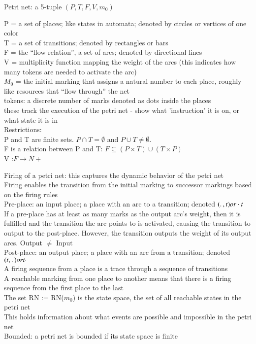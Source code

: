 \begin{definition}
\label{def:Petri-net}
Petri net: a 5-tuple $(P, T, F, V, m_0)$ 

P = a set of places; like states in automata; denoted by circles or vertices of one color\\
T = a set of transitions; denoted by rectangles or bars\\
F = the “flow relation”, a set of arcs; denoted by directional lines\\
V = multiplicity function mapping the weight of the arcs (this indicates how many tokens are needed to activate the arc)\\
$M_0$ = the initial marking that assigns a natural number to each place, roughly like resources that “flow through” the net\\
	tokens: a discrete number of marks denoted as dots inside the places \\
	these track the execution of the petri net - show what 'instruction' it is on, or what state it is in\\
	
\noindent Restrictions: \\
P and T are finite sets. $P\cap T = \emptyset$   and $P\cup T \neq \emptyset.$\\
F is a relation between P and T: $ F \subseteq (P \times T) \cup (T \times P)$\\
V :$ F \rightarrow N+ $\\
\end {definition}
Firing of a petri net: this captures the dynamic behavior of the petri net\\
Firing enables the transition from the initial marking to successor markings based on the firing rules\\
Pre-place: an input place; a place with an arc to a transition; denoted $(\ldotp , t) or  \cdot t$\\
If a pre-place has at least as many marks as the output arc's weight, then it is fulfilled and the transition the arc points to is activated, causing the transition to output to the post-place. However, the transition outputs the weight of its output arcs. Output $\ne$ Input\\
Post-place: an output place; a place with an arc from a transition; denoted $(t, \ldotp ) or t \cdot $ \\
A firing sequence from a place is a trace through a sequence of transitions\\
A reachable marking from one place to another means that there is a firing sequence from the first place to the last\\
The set RN := RN($m_0$) is the state space, the set of all reachable states in the petri net\\
This holds information about what events are possible and impossible in the petri net\\
Bounded: a petri net is bounded if its state space is finite \smallskip\\

